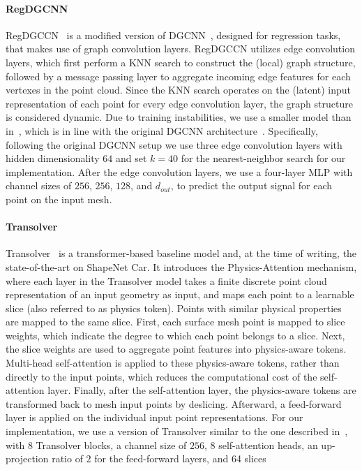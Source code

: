 \paragraph{RegDGCNN} RegDGCCN~\cite{elrefaie2024drivaernet} is a modified version of \acf{DGCNN}~\cite{wang2019dynamic}, designed for regression tasks, that makes use of graph convolution layers.
RegDGCCN utilizes edge convolution layers, which first perform a \ac{KNN} search to construct the (local) graph structure, followed by a message passing layer to aggregate incoming edge features for each vertexes in the point cloud.
Since the \ac{KNN} search operates on the (latent) input representation of each point for every edge convolution layer, the graph structure is considered dynamic.
Due to training instabilities, we use a smaller model than in~\cite{elrefaie2024drivaernet, elrefaie2024drivaernet++}, which is in line with the original \ac{DGCNN} architecture~\cite{wang2019dynamic}. 
Specifically, following the original \ac{DGCNN} setup we use three edge convolution layers with hidden dimensionality $64$ and set $k=40$ for the nearest-neighbor search for our implementation. 
After the edge convolution layers, we use a four-layer MLP with channel sizes of $256$, $256$, $128$, and $d_{out}$, to predict the output signal for each point on the input mesh.

\paragraph{Transolver} Transolver~\cite{wu2024transolver} is a transformer-based baseline model and, at the time of writing, the state-of-the-art on ShapeNet Car.
It introduces the Physics-Attention mechanism, where each layer in the Transolver model takes a finite discrete point cloud representation of an input geometry as input, and maps each point to a learnable slice (also referred to as physics token).
Points with similar physical properties are mapped to the same slice.
First, each surface mesh point is mapped to slice weights, which indicate the degree to which each point belongs to a slice.
Next, the slice weights are used to aggregate point features into physics-aware tokens.
Multi-head self-attention is applied to these physics-aware tokens, rather than directly to the input points, which reduces the computational cost of the self-attention layer.
Finally, after the self-attention layer, the physics-aware tokens are transformed back to mesh input points by deslicing. 
Afterward, a feed-forward layer is applied on the individual input point representations. 
For our implementation, we use a version of Transolver similar to the one described in~\cite{wu2024transolver}, with $8$ Transolver blocks, a channel size of $256$, $8$ self-attention heads, an up-projection ratio of $2$ for the feed-forward layers, and 64 slices

